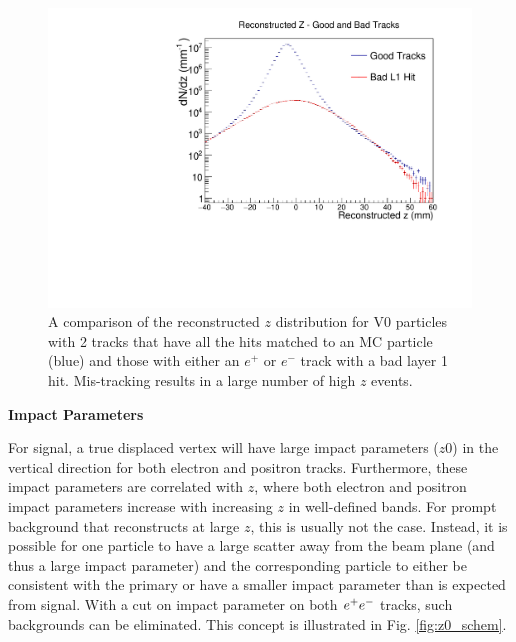 
\begin{figure}[t]
    \centering
    \includegraphics[width=.85\textwidth]{figs/selection/isocut_goodbad_z.pdf}
    \caption{A comparison of the reconstructed $z$ distribution for V0 particles with 2 tracks that have all the hits matched to an MC particle (blue) and those with either an $e^+$ or $e^-$ track with a bad layer 1 hit. Mis-tracking results in a large number of high $z$ events.}
    \label{fig:iso_good_bad}
\end{figure}

\clearpage

\textbf{Impact Parameters}

For signal, a true displaced vertex will have large impact parameters ($z0$) in the vertical direction for both electron and positron tracks. Furthermore, these impact parameters are correlated with $z$, where both electron and positron impact parameters increase with increasing $z$ in well-defined bands. For prompt background that reconstructs at large $z$, this is usually not the case. Instead, it is possible for one particle to have a large scatter away from the beam plane (and thus a large impact parameter) and the corresponding particle to either be consistent with the primary or have a smaller impact parameter than is expected from signal. With a cut on impact parameter on both $e^{+}e^{-}$ tracks, such backgrounds can be eliminated. This concept is illustrated in Fig. \ref{fig:z0_schem}.

